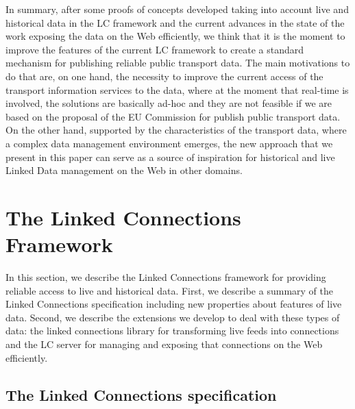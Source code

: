\documentclass[sw]{iosart2x}
\begin{document}
	In summary, after some proofs of concepts developed taking into account live and historical data in the LC framework and the current advances in the state of the work exposing the data on the Web efficiently, we think that it is the moment to improve the features of the current LC framework to create a standard mechanism for publishing reliable public transport data. The main motivations to do that are, on one hand, the necessity to improve the current access of the transport information services to the data, where at the moment that real-time is involved, the solutions are basically ad-hoc and they are not feasible if we are based on the proposal of the EU Commission for publish public transport data. On the other hand, supported by the characteristics of the transport data, where a complex data management environment emerges, the new approach that we present in this paper can serve as a source of inspiration for historical and live Linked Data management on the Web in other domains.
	
	
	\section{The Linked Connections Framework}
	In this section, we describe the Linked Connections framework for providing reliable access to live and historical data. First, we describe a summary of the Linked Connections specification including new properties about features of live data. Second, we describe the extensions we develop to deal with these types of data: the linked connections library for transforming live feeds into connections and the LC server for managing and exposing that connections on the Web efficiently.
	
	\subsection{The Linked Connections specification}
	
\end{document}
